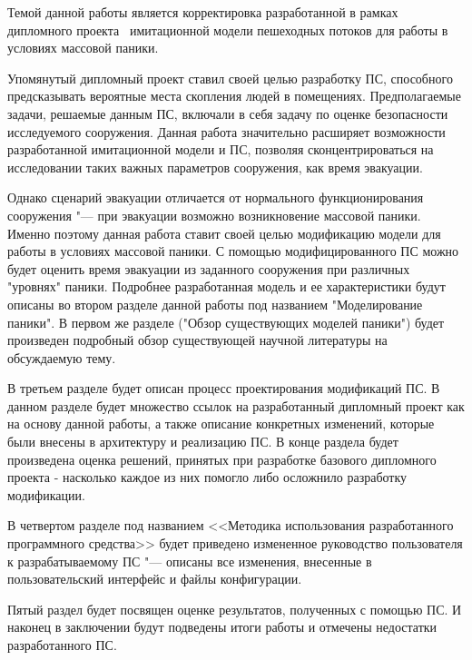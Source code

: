 
\label{sec:intro}

Темой данной работы является корректировка разработанной в рамках дипломного проекта~\cite{my_diploma} имитационной модели пешеходных потоков для работы в условиях массовой паники.

Упомянутый дипломный проект ставил своей целью разработку ПС, способного предсказывать вероятные места скопления людей в помещениях.
Предполагаемые задачи, решаемые данным ПС, включали в себя задачу по оценке безопасности исследуемого сооружения.
Данная работа значительно расширяет возможности разработанной имитационной модели и ПС, позволяя сконцентрироваться на исследовании таких важных параметров сооружения, как время эвакуации.

Однако сценарий эвакуации отличается от нормального функционирования сооружения "--- при эвакуации возможно возникновение массовой паники.
Именно поэтому данная работа ставит своей целью модификацию модели для работы в условиях массовой паники.
С помощью модифицированного ПС можно будет оценить время эвакуации из заданного сооружения при различных "уровнях" паники.
Подробнее разработанная модель и ее характеристики будут описаны во втором разделе данной работы под названием "Моделирование паники".
В первом же разделе ("Обзор существующих моделей паники") будет произведен подробный обзор существующей научной литературы на обсуждаемую тему.

В третьем разделе будет описан процесс проектирования модификаций ПС.
В данном разделе будет множество ссылок на разработанный дипломный проект как на основу данной работы, а также описание конкретных изменений, которые были внесены в архитектуру и реализацию ПС.
В конце раздела будет произведена оценка решений, принятых при разработке базового дипломного проекта - насколько каждое из них помогло либо осложнило разработку модификации.

В четвертом разделе под названием <<Методика использования разработанного программного средства>> будет приведено измененное руководство пользователя к разрабатываемому ПС "--- описаны все изменения, внесенные в пользовательский интерфейс и файлы конфигурации.

Пятый раздел будет посвящен оценке результатов, полученных с помощью ПС.
И наконец в заключении будут подведены итоги работы и отмечены недостатки разработанного ПС.
